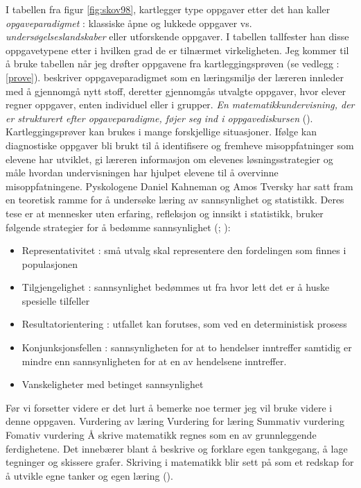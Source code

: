 \documentclass[main.tex]{subfiles}
\begin{document}
I tabellen fra figur \ref{fig:skov98}, kartlegger  type oppgaver etter det han kaller 
\emph{opgaveparadigmet} :
klassiske åpne og lukkede oppgaver vs. \emph{undersøgelseslandskaber} eller utforskende oppgaver. I tabellen tallfester
han disse oppgavetypene etter i hvilken grad de er tilnærmet virkeligheten. Jeg kommer til å bruke tabellen når jeg
drøfter oppgavene fra kartleggingsprøven (se vedlegg : \ref{prove}).  beskriver oppgaveparadigmet som
en læringsmiljø der læreren innleder med å gjennomgå nytt stoff, deretter gjennomgås utvalgte oppgaver, hvor elever 
regner oppgaver, enten individuel eller i grupper. \emph{En matematikkundervisning, der er strukturert efter 
opgaveparadigme, føjer seg ind i \guillemotleft oppgavediskursen\guillemotright} ().
\newline
\newline
Kartleggingsprøver kan brukes i mange forskjellige situasjoner. Ifølge  kan diagnostiske oppgaver 
bli brukt til å identifisere og fremheve misoppfatninger som elevene har utviklet, gi læreren informasjon
om elevenes løsningsstrategier og måle hvordan undervisningen har hjulpet elevene til å overvinne 
misoppfatningene. Pyskologene Daniel Kahneman og Amos Tversky har satt fram en teoretisk ramme for å undersøke 
læring av sannsynlighet og statistikk. Deres tese er at mennesker uten erfaring, refleksjon og innsikt i statistikk,
bruker følgende strategier for å bedømme sannsynlighet (; ):
\begin{itemize}
\item Representativitet : små utvalg skal representere den fordelingen som finnes i populasjonen
\item Tilgjengelighet : sannsynlighet bedømmes ut fra hvor lett det er å huske spesielle tilfeller
\item Resultatorientering : utfallet kan forutses, som ved en deterministisk prosess
\item Konjunksjonsfellen : sannsynligheten for at to hendelser inntreffer samtidig er mindre enn sannsynligheten
for at en av hendelsene inntreffer.
\item Vanskeligheter med betinget sannsynlighet
\end{itemize}
Før vi forsetter videre er det lurt å bemerke noe termer jeg vil bruke videre i denne oppgaven.
\newline
Vurdering av læring
\newline
Vurdering for læring
\newline
Summativ vurdering
\newline
Fomativ vurdering
\newline
\newline
Å skrive matematikk regnes som en av grunnleggende ferdighetene. Det innebærer blant å beskrive og forklare 
egen tankgegang, å lage tegninger og skissere grafer. Skriving i matematikk blir sett på som et redskap for å 
utvikle egne tanker og egen læring ().
\end{document}
